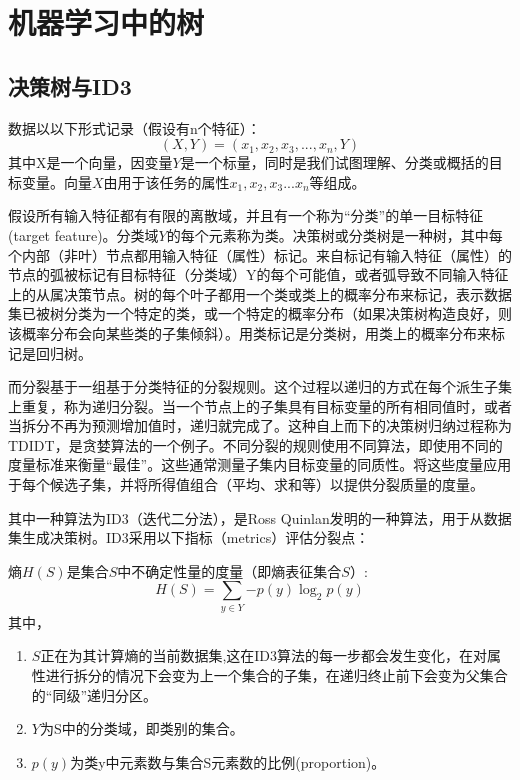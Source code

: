
\chapter{机器学习中的树}

\section{决策树与ID3}

数据以以下形式记录（假设有n个特征）：
$$(X,Y)=(x_1,x_2,x_3,...,x_n,Y)$$
其中X是一个向量，因变量$Y$是一个标量，同时是我们试图理解、分类或概括的目标变量。向量$X$由用于该任务的属性$x_1,x_2,x_3...x_n$等组成。

假设所有输入特征都有有限的离散域，并且有一个称为“分类”的单一目标特征(target feature)。分类域$Y$的每个元素称为类。决策树或分类树是一种树，其中每个内部（非叶）节点都用输入特征（属性）标记。来自标记有输入特征（属性）的节点的弧被标记有目标特征（分类域）Y的每个可能值，或者弧导致不同输入特征上的从属决策节点。树的每个叶子都用一个类或类上的概率分布来标记，表示数据集已被树分类为一个特定的类，或一个特定的概率分布（如果决策树构造良好，则该概率分布会向某些类的子集倾斜）\cite{enwiki:1027552736}。用类标记是分类树，用类上的概率分布来标记是回归树。

而分裂基于一组基于分类特征的分裂规则。这个过程以递归的方式在每个派生子集上重复，称为递归分裂。当一个节点上的子集具有目标变量的所有相同值时，或者当拆分不再为预测增加值时，递归就完成了。这种自上而下的决策树归纳过程称为TDIDT，是贪婪算法的一个例子。不同分裂的规则使用不同算法，即使用不同的度量标准来衡量“最佳”。这些通常测量子集内目标变量的同质性。将这些度量应用于每个候选子集，并将所得值组合（平均、求和等）以提供分裂质量的度量。

其中一种算法为ID3（迭代二分法），是Ross Quinlan发明的一种算法，用于从数据集生成决策树。ID3采用以下指标（metrics）评估分裂点：

熵$H(S)$是集合$S$中不确定性量的度量（即熵表征集合$S$）:
$$H(S) = \sum_{y\in Y}{-p(y)\log _{2}p(y)}$$
其中，
\begin{enumerate}
	\item $S$正在为其计算熵的当前数据集,这在ID3算法的每一步都会发生变化，在对属性进行拆分的情况下会变为上一个集合的子集，在递归终止前下会变为父集合的“同级”递归分区。
	\item $Y$为S中的分类域，即类别的集合。
	\item $p(y)$为类y中元素数与集合S元素数的比例(proportion)。
\end{enumerate}

